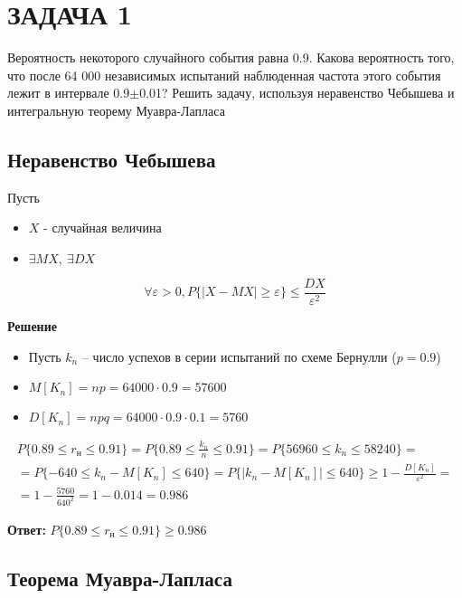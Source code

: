 \section{ЗАДАЧА 1}

Вероятность некоторого случайного события равна 0.9. Какова вероятность того, что после 64 000 независимых испытаний наблюденная частота этого события лежит в интервале 0.9$\pm$0.01? Решить задачу, используя неравенство Чебышева и интегральную теорему Муавра-Лапласа

\subsection{Неравенство Чебышева}

Пусть

\begin{itemize}
    \item $X$ - случайная величина
    \item $\exists MX,\ \exists DX$
\end{itemize}

\begin{equation*}
    \forall \varepsilon > 0, P\{ |X - MX| \geq \varepsilon \} \le \frac{DX}{\varepsilon^2}
\end{equation*}

\textbf{Решение}

\begin{itemize}
    \item Пусть $k_n$ -- число успехов в серии испытаний по схеме Бернулли ($p = 0.9$)
    \item $M[K_n] = np = 64000 \cdot 0.9 = 57600$
    \item $D[K_n] = npq = 64000 \cdot 0.9 \cdot 0.1 = 5760$
\end{itemize}

\begin{multline*}
    P \{ 0.89 \le r_\text{н} \le 0.91 \} = P \{ 0.89 \le \frac{k_n}{n} \le 0.91 \} = P \{ 56960 \le k_n \le 58240 \} = \\
    = P \{ -640 \le k_n - M[K_n] \le 640 \} = P\big\{ \big|k_n - M[K_n]\big| \le 640 \big\} \geq 1 - \frac{D[K_n]}{\varepsilon^2} = \\
    = 1 - \frac{5760}{640^2} = 1 - 0.014 = 0.986
\end{multline*}

\textbf{Ответ:} $P \{ 0.89 \le r_\text{н} \le 0.91 \} \geq 0.986$

\subsection{Теорема Муавра-Лапласа}

